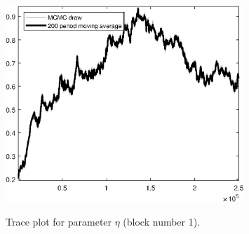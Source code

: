 \begin{figure}[H]
\centering
  \includegraphics[width=0.8\textwidth]{BRS_aggregate/graphs/TracePlot_eta_blck_1}\\
    \caption{Trace plot for parameter ${\eta}$ (block number 1).}
\end{figure}
